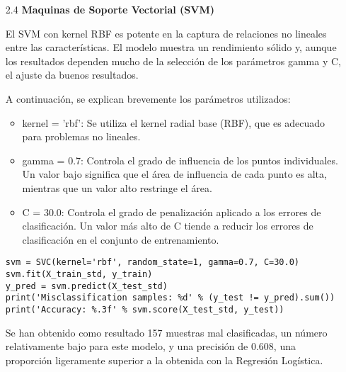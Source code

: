 \documentclass{article}
\begin{document}
\bigskip

\begin{itemize}

\item[2.4]  {\bf Maquinas de Soporte Vectorial (SVM)}

El SVM con kernel RBF es potente en la captura de relaciones no lineales entre las caracter\'isticas. El modelo muestra un rendimiento s\'olido y, aunque los resultados dependen mucho de la selecci\'on de los par\'ametros gamma y C, el ajuste da buenos resultados.

A continuaci\'on, se explican brevemente los par\'ametros utilizados:

\begin{itemize}

\item
kernel = 'rbf': Se utiliza el kernel radial base (RBF), que es adecuado para problemas no lineales.

\item
gamma = 0.7: Controla el grado de influencia de los puntos individuales. Un valor bajo significa que el \'area de influencia de cada punto es alta, mientras que un valor alto restringe el \'area.

\item
C = 30.0: Controla el grado de penalizaci\'on aplicado a los errores de clasificaci\'on. Un valor m\'as alto de C tiende a reducir los errores de clasificaci\'on en el conjunto de entrenamiento.

\end{itemize}

\begin{tcolorbox}[width=14cm]
\begin{scriptsize}
\begin{verbatim}
svm = SVC(kernel='rbf', random_state=1, gamma=0.7, C=30.0)
svm.fit(X_train_std, y_train)
y_pred = svm.predict(X_test_std)
print('Misclassification samples: %d' % (y_test != y_pred).sum())
print('Accuracy: %.3f' % svm.score(X_test_std, y_test))
\end{verbatim}
\end{scriptsize}
\end{tcolorbox}

Se han obtenido como resultado 157 muestras mal clasificadas, un n\'umero relativamente bajo para este modelo, y una precisi\'on de 0.608, una proporci\'on ligeramente superior a la obtenida con la Regresi\'on Log\'istica.

\end{itemize}
\end{document}
